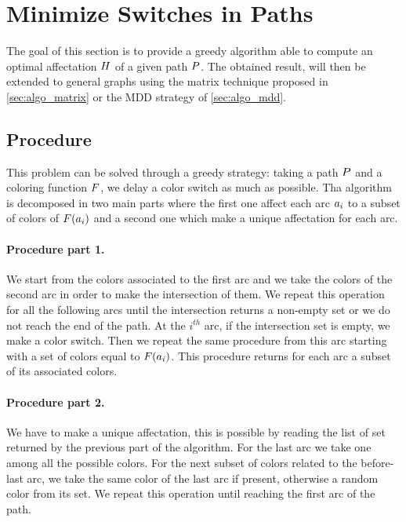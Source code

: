 \section{Minimize Switches in Paths}

The goal of this section is to provide a greedy algorithm able to compute an optimal affectation $H$ of a given path $P$. The obtained result, will then be extended to general graphs using the matrix technique proposed in \cref{sec:algo_matrix} or the MDD strategy of \cref{sec:algo_mdd}.

\subsection{Procedure}
\label{sec:path_proc}
This problem can be solved through a greedy strategy: taking a path $P$ and a coloring function $F$, we delay a color switch as much as possible. Tha algorithm is decomposed in two main parts where the first one affect each arc $a_i$ to a subset of colors of $F(a_i)$ and a second one which make a unique affectation for each arc.

\paragraph*{Procedure part 1.}
We start from the colors associated to the first arc and we take the colors of the second arc in order to make the intersection of them. We repeat this operation for all the following arcs until the intersection returns a non-empty set or we do not reach the end of the path. At the $i^{th}$ arc, if the intersection set is empty, we make a color switch. Then we repeat the same procedure from this arc starting with a set of colors equal to $F(a_i)$. This procedure returns for each arc a subset of its associated colors.

\paragraph*{Procedure part 2.}
We have to make a unique affectation, this is possible by reading the list of set returned by the previous part of the algorithm. For the last arc we take one among all the possible colors. For the next subset of colors related to the before-last arc, we take the same color of the last arc if present, otherwise a random color from its set. We repeat this operation until reaching the first arc of the path.

